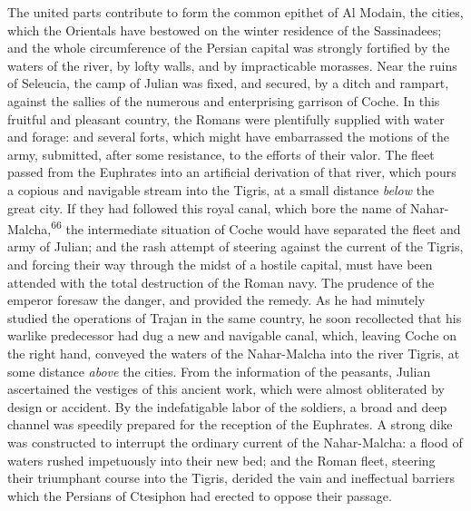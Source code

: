 The united parts contribute to form the common epithet of Al
Modain, the cities, which the Orientals have bestowed on the
winter residence of the Sassinadees; and the whole circumference
of the Persian capital was strongly fortified by the waters of
the river, by lofty walls, and by impracticable morasses. Near
the ruins of Seleucia, the camp of Julian was fixed, and secured,
by a ditch and rampart, against the sallies of the numerous and
enterprising garrison of Coche. In this fruitful and pleasant
country, the Romans were plentifully supplied with water and
forage: and several forts, which might have embarrassed the
motions of the army, submitted, after some resistance, to the
efforts of their valor. The fleet passed from the Euphrates into
an artificial derivation of that river, which pours a copious and
navigable stream into the Tigris, at a small distance \textit{below} the
great city. If they had followed this royal canal, which bore the
name of Nahar-Malcha,\textsuperscript{66} the intermediate situation of Coche
would have separated the fleet and army of Julian; and the rash
attempt of steering against the current of the Tigris, and
forcing their way through the midst of a hostile capital, must
have been attended with the total destruction of the Roman navy.
The prudence of the emperor foresaw the danger, and provided the
remedy. As he had minutely studied the operations of Trajan in
the same country, he soon recollected that his warlike
predecessor had dug a new and navigable canal, which, leaving
Coche on the right hand, conveyed the waters of the Nahar-Malcha
into the river Tigris, at some distance \textit{above} the cities. From
the information of the peasants, Julian ascertained the vestiges
of this ancient work, which were almost obliterated by design or
accident. By the indefatigable labor of the soldiers, a broad and
deep channel was speedily prepared for the reception of the
Euphrates. A strong dike was constructed to interrupt the
ordinary current of the Nahar-Malcha: a flood of waters rushed
impetuously into their new bed; and the Roman fleet, steering
their triumphant course into the Tigris, derided the vain and
ineffectual barriers which the Persians of Ctesiphon had erected
to oppose their passage.


